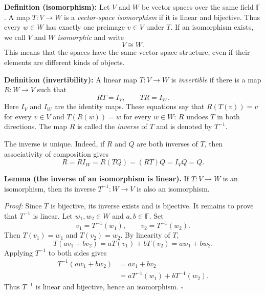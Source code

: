 \documentclass[a4paper,11pt,abstract=true]{scrartcl}
\theoremstyle{dotlessP}
\theoremstyle{dotlessS}
\theoremstyle{remark}
\theoremstyle{definition}
\begin{document}
\begin{definition_box}
\textbf{Definition (isomorphism):} Let $V$ and $W$ be vector spaces
over the same field $\mathbb{F}$. A map $T:V\longrightarrow W$ is a
\emph{vector-space isomorphism} if it is linear and bijective. Thus every
$w\in W$ has exactly one preimage $v\in V$ under $T$.
If an isomorphism exists, we call $V$ and $W$ \emph{isomorphic} and write
\[
V\cong W.
\]
This means that the spaces have the same vector-space structure, even if
their elements are different kinds of objects.
\end{definition_box}

\begin{definition_box}
\textbf{Definition (invertibility):} A linear map
$T:V\longrightarrow W$ is \emph{invertible} if there is a map
$R:W\longrightarrow V$ such that
\[
RT=I_V,\qquad TR=I_W.
\]
Here $I_V$ and $I_W$ are the identity maps. These equations say that
$R(T(v))=v$ for every $v\in V$ and $T(R(w))=w$ for every $w\in W$:
$R$ undoes $T$ in both directions. The map $R$ is called the
\emph{inverse} of $T$ and is denoted by $T^{-1}$.
\end{definition_box}

\begin{claim_box}
The inverse is unique. Indeed, if $R$ and $Q$ are both inverses of $T$,
then associativity of composition gives
\[
R=R I_W=R(TQ)=(RT)Q=I_V Q=Q.
\]
\end{claim_box}

\begin{claim_box}
\textbf{Lemma (the inverse of an isomorphism is linear).} If
$T:V\longrightarrow W$ is an isomorphism, then its inverse
$T^{-1}:W\longrightarrow V$ is also an isomorphism.

\textit{Proof:} Since $T$ is bijective, its inverse exists and is bijective.
It remains to prove that $T^{-1}$ is linear. Let $w_1,w_2\in W$ and
$a,b\in\mathbb{F}$. Set
\[
v_1=T^{-1}(w_1),\qquad v_2=T^{-1}(w_2).
\]
Then $T(v_1)=w_1$ and $T(v_2)=w_2$. By linearity of $T$,
\[
T(av_1+bv_2)=aT(v_1)+bT(v_2)=aw_1+bw_2.
\]
Applying $T^{-1}$ to both sides gives
\[
\begin{aligned}
T^{-1}(aw_1+bw_2)
&=av_1+bv_2\\
&=aT^{-1}(w_1)+bT^{-1}(w_2).
\end{aligned}
\]
Thus $T^{-1}$ is linear and bijective, hence an isomorphism.
\hfill$\square$
\end{claim_box}
\end{document}
